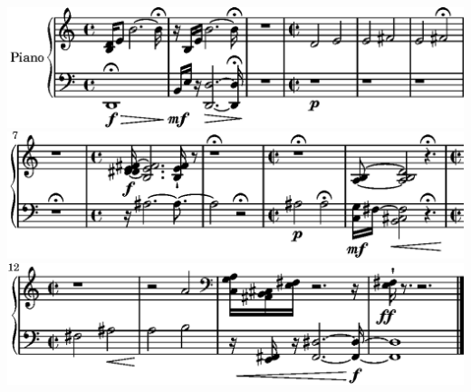 \includegraphics{./bwv4/c4/lily-5db26cef-1}%
\ifx\betweenLilyPondSystem \undefined
  \linebreak
\else
  \expandafter{}%
\fi
\includegraphics{./bwv4/c4/lily-5db26cef-2}%
\ifx\betweenLilyPondSystem \undefined
  \linebreak
\else
  \expandafter{}%
\fi
\includegraphics{./bwv4/c4/lily-5db26cef-3}%
